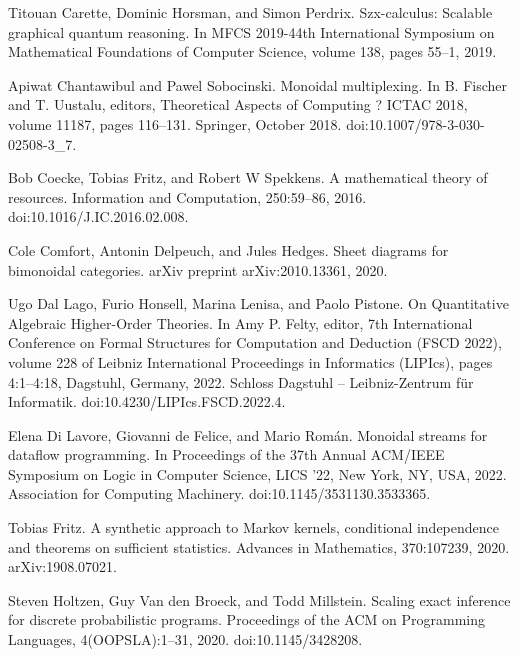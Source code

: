 \documentclass[10pt,a4paper]{article}
\begin{document}
\par\noindent  [4]  Titouan Carette, Dominic Horsman, and Simon Perdrix.  Szx-calculus: Scalable graphical quantum reasoning.  In MFCS 2019-44th International Symposium on Mathematical Foundations of Computer Science, volume 138, pages 55–1, 2019.  
 
\par\noindent  [5]  Apiwat Chantawibul and Pawel Sobocinski.  Monoidal multiplexing.  In B. Fischer and T. Uustalu, editors, Theoretical Aspects of Computing ? ICTAC 2018, volume 11187, pages 116–131. Springer, October 2018.  doi:10.1007/978-3-030-02508-3\_7.  
 
\par\noindent  [6]  Bob Coecke, Tobias Fritz, and Robert W Spekkens.  A mathematical theory of resources.  Information and Computation, 250:59–86, 2016.  doi:10.1016/J.IC.2016.02.008.  
 
\par\noindent  [7]  Cole Comfort, Antonin Delpeuch, and Jules Hedges.  Sheet diagrams for bimonoidal categories.  arXiv preprint arXiv:2010.13361, 2020.  
 
\par\noindent  [8]  Ugo Dal Lago, Furio Honsell, Marina Lenisa, and Paolo Pistone.  On Quantitative Algebraic Higher-Order Theories.  In Amy P. Felty, editor, 7th International Conference on Formal Structures for Computation and Deduction (FSCD 2022), volume 228 of Leibniz International Proceedings in Informatics (LIPIcs), pages 4:1–4:18, Dagstuhl, Germany, 2022. Schloss Dagstuhl – Leibniz-Zentrum für Informatik.  doi:10.4230/LIPIcs.FSCD.2022.4.  
 
\par\noindent  [9]  Elena Di Lavore, Giovanni de Felice, and Mario Román.  Monoidal streams for dataflow programming.  In Proceedings of the 37th Annual ACM/IEEE Symposium on Logic in Computer Science, LICS ’22, New York, NY, USA, 2022. Association for Computing Machinery.  doi:10.1145/3531130.3533365.  
 
\par\noindent  [10]  Tobias Fritz.  A synthetic approach to Markov kernels, conditional independence and theorems on sufficient statistics.  Advances in Mathematics, 370:107239, 2020.  arXiv:1908.07021.  
 
\par\noindent  [11]  Steven Holtzen, Guy Van den Broeck, and Todd Millstein.  Scaling exact inference for discrete probabilistic programs.  Proceedings of the ACM on Programming Languages, 4(OOPSLA):1–31, 2020.  doi:10.1145/3428208.  
 
\end{document}
